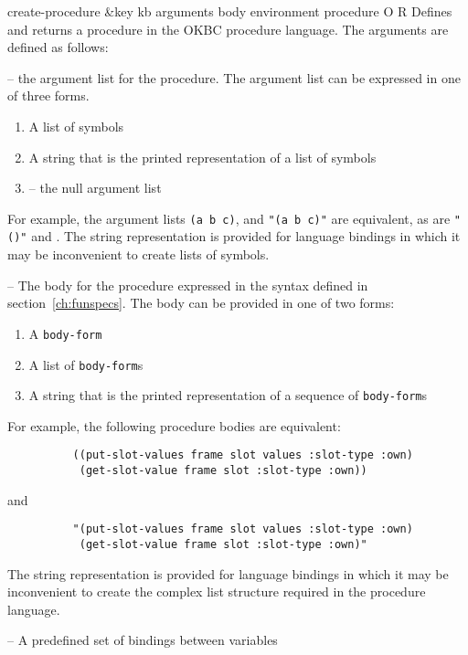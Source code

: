 \begin{okbcop}{create-procedure}{ \&key kb arguments body environment} { procedure } { O } { R } {  }
Defines and returns a procedure in the OKBC procedure language.  The
   arguments are defined as follows:
   \bitem
   \item {} -- the argument list for the procedure.  The
          argument list can be expressed in one of three forms.
          \begin{enumerate}
          \item A list of symbols
          \item A string that is the printed representation of a list
                 of symbols
          \item \false -- the null argument list
          \end{enumerate}
          For example, the argument lists {\tt (a b c)}, and
          {\tt "(a b c)"} are equivalent, as are {\tt "()"} and \false.
          The string representation is provided for language bindings in
          which it may be inconvenient to create lists of symbols.
   \item {} -- The body for the procedure expressed in the syntax
          defined in section~\ref{ch:funspecs}.  The body can be
          provided in one of two forms:
          \begin{enumerate}
          \item A {\tt body-form}
          \item A list of {\tt body-form}s
          \item A string that is the printed representation of a sequence
                 of {\tt body-form}s
          \end{enumerate}
          For example, the following procedure bodies are equivalent:
          \begin{verbatim}
          ((put-slot-values frame slot values :slot-type :own)
           (get-slot-value frame slot :slot-type :own))
          \end{verbatim}
          and
          \begin{verbatim}
          "(put-slot-values frame slot values :slot-type :own)
           (get-slot-value frame slot :slot-type :own)"
          \end{verbatim}
          The string representation is provided for language bindings in
          which it may be inconvenient to create the complex list structure
          required in the procedure language.
   \item {} -- A predefined set of bindings between variables

\end{okbcop}
